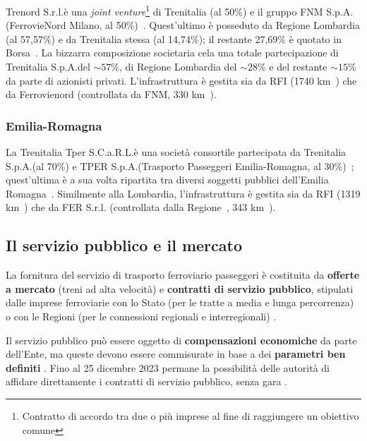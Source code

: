 \documentclass[12pt,a4paper,italian]{report}
\begin{document}
Trenord S.r.l.\@ è una \textit{joint venture}\footnote{Contratto di
    accordo tra due o più imprese al fine di raggiungere un obiettivo
    comune} di Trenitalia (al 50\%) e il gruppo FNM S.p.A.\@
(FerrovieNord Milano, al 50\%)~\cite{TrenordChiSiamo}.  Quest'ultimo è
posseduto da Regione Lombardia (al 57,57\%) e da Trenitalia stessa (al
14,74\%); il restante 27,69\% è quotato in
Borsa~\cite{BorsaItalianaFNM}.  La bizzarra composizione societaria
cela una totale partecipazione di Trenitalia S.p.A.\@ del $\sim 57\%$,
di Regione Lombardia del $\sim 28$\% e del restante $\sim 15\%$ da
parte di azionisti privati.  L'infrastruttura è gestita sia da RFI
(1740 km~\cite{RfiKm}) che da Ferrovienord (controllata da FNM, 330
km~\cite{FerNordKm}).

\subsubsection{Emilia-Romagna}

La Trenitalia Tper S.C.a.R.L.\@ è una società consortile partecipata
da Trenitalia S.p.A.\@ (al 70\%) e TPER S.p.A.\@ (Trasporto Passeggeri
Emilia-Romagna, al 30\%)~\cite{NascitaTper}; quest'ultima è a sua
volta ripartita tra diversi soggetti pubblici dell'Emilia
Romagna~\cite{SociTper}.  Similmente alla Lombardia, l'infrastruttura
è gestita sia da RFI (1319 km~\cite{RfiKm}) che da FER S.r.l.\@
(controllata dalla Regione~\cite{FerChiSiamo}, 343 km~\cite{FerKm}).

\subsection{Il servizio pubblico e il mercato}
\label{servizio_pubblico}

La fornitura del servizio di trasporto ferroviario passeggeri è
costituita da \textbf{offerte a mercato} (treni ad alta velocità) e
\textbf{contratti di servizio pubblico}, stipulati dalle imprese
ferroviarie con lo Stato (per le tratte a media e lunga percorrenza) o
con le Regioni (per le connessioni regionali e interregionali)
\cite[vedi][paragrafo \textit{``Gli obblighi di servizio pubblico e i
    contratti di servizio''}]{CameraTrasportoFerroviario}.

Il servizio pubblico può essere oggetto di \textbf{compensazioni
    economiche} da parte dell'Ente, ma queste devono essere
commisurate in base a dei \textbf{parametri ben definiti} \cite[art.\
4, comma 1]{Reg1370}.  Fino al 25 dicembre 2023 permane la possibilità
delle autorità di affidare direttamente i contratti di servizio
pubblico, senza gara \cite[art.\ 8, comma 2, lettera iii)]{Reg1370}.
\end{document}
